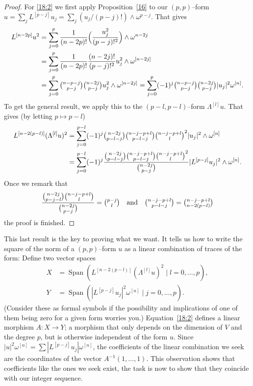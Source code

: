 \documentclass[11pt,a4paper]{amsart}
\def\^#1{^{[#1]}}
\theoremstyle{definition}
\numberwithin{equation}{section}
\begin{document}
\begin{proof}
For \eqref{18:2} we first 
apply Proposition~\ref{16} to our $(p,p)$--form
$u = \sum_j L\^{p-j} u_j = \sum_j (u_j/(p-j)!) \wedge \omega^{p-j}$.
That gives
\begin{align*}
L\^{n-2p} u^2 
&= \sum_{j=0}^p \frac{1}{(n-2p)!}\Bigl( \frac{u_j^2}{(p-j)!^2} \Bigr) 
\wedge \omega^{n-2j}\\
&= \sum_{j=0}^p \frac{1}{(n-2p)!}\frac{(n-2j)!}{(p-j)!^2} 
u_j^2 \wedge \omega\^{n-2j}\\
&= \sum_{j=0}^p \tbinom{n-p-j}{p-j} \tbinom{n-2j}{p-j}
u_j^2 \wedge \omega\^{n-2j}
= \sum_{j=0}^p (-1)^j \tbinom{n-p-j}{p-j} \tbinom{n-2j}{p-j}
\lvert u_j \rvert^2 \omega\^{n}.
\end{align*}
To get the general result, we apply this to the $(p-l,p-l)$--form $\Lambda\^ l
u$. That gives (by letting $p \mapsto p - l$)
\begin{align*}
  L\^{n-2(p-l)} (\Lambda\^ l u)^2   
  &= \sum_{j=0}^{p-l} 
  (-1)^j
  \tbinom{n-2j}{p-l-j}
  \tbinom{n-j-p+l}{p-l-j}
  \tbinom{n-j-p+l}{l}^2
  \lvert u_j \rvert^2
  \wedge \omega\^ n
  \\
  &= \sum_{j=0}^{p-l} 
  (-1)^j
  \frac{
  \tbinom{n-2j}{p-l-j}
  \tbinom{n-j-p+l}{p-l-j}
  \tbinom{n-j-p+l}{l}^2
  }{\tbinom{n-2j}{p-j}}
  \lvert L\^{p-j} u_j \rvert^2
  \wedge \omega\^ n.
\end{align*}
Once we remark that
$$
\frac{\binom{n-2j}{p-j-l} \binom{n-j-p+l}{l}}{\binom{n-2j}{p-j}}
= \tbinom{p-j}{l}
\quad\hbox{and}\quad
\tbinom{n-j-p+l}{p-l-j} = \tbinom{n-j-p+l}{n-2(p-l)}
$$
the proof is finished.
\end{proof}


This last result is the key to proving what we want. It tells us how to
write the square of the norm of a $(p,p)$--form $u$ as a linear
combination of traces of the form: Define two vector spaces 
\begin{align*}
X &= \operatorname{Span}(L\^{n-2(p-l)} (\Lambda\^ l u)^2 \mid l = 0,\ldots,p),
\\
Y &= \operatorname{Span}(|L\^{p-j}u_j|^2 \omega\^{n} \mid j=0,\ldots,p).
\end{align*}
(Consider these as formal symbols if the possibility and implications of
one of them being zero for a given form worries you.) Equation~\eqref{18:2}
defines a linear morphism $A : X \to Y$; a morphism that only depends
on the dimension of $V$ and the degree $p$, but is otherwise independent of
the form $u$. Since $|u|^2\omega\^n = \sum |L\^{p-j}u_j| \omega\^n$,  
the coefficients of the linear combination we seek are the coordinates of
the vector $A^{-1}(1,\ldots,1)$. This observation shows that coefficients like the ones we seek exist, the task is now to show that they coincide with our integer sequence.
\end{document}
